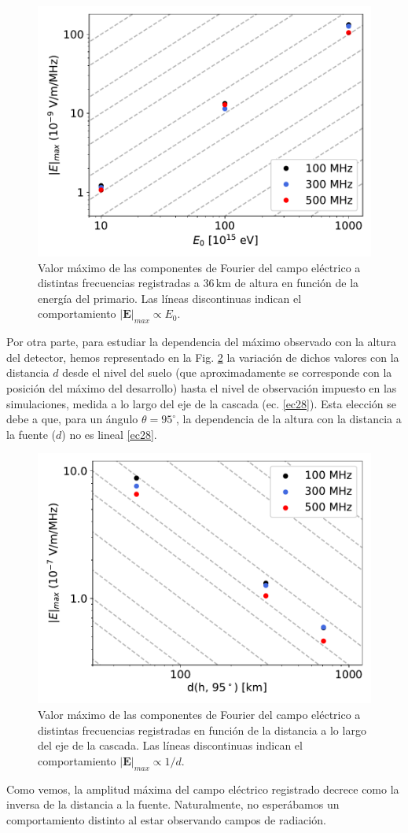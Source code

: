 \documentclass[11 pt, a4paper]{article} %
\numberwithin{equation}{section}
\numberwithin{figure}{section}
\numberwithin{table}{section}
\newcommand{\vect}[1]{\boldsymbol{\mathbf{#1}}}
\begin{document}
\begin{figure}[H]
	\centering
	\includegraphics[width=.5\linewidth]{figures/Radio_UG/85deg_varE_36km_Emax_vs_E}
	\caption{Valor máximo de las componentes de Fourier del campo eléctrico a distintas frecuencias registradas a $36\,\mathrm{km}$ de altura en función de la energía del primario. Las líneas discontinuas indican el comportamiento $\left|\vect{E}\right|_{max}\propto E_0$.}
	\label{EmaxvsE}
\end{figure}
Por otra parte, para estudiar la dependencia del máximo observado con la altura del detector, hemos representado en la Fig. \ref{Emaxvsd} la variación de dichos valores con la distancia $d$  desde el nivel del suelo (que aproximadamente se corresponde con la posición del máximo del desarrollo) hasta el nivel de observación impuesto en las simulaciones, medida a lo largo del eje de la cascada (ec. \ref{ec28}). Esta elección se debe a que, para un ángulo $\theta=95^\circ$, la dependencia de la altura con la distancia a la fuente ($d$) no es lineal \eqref{ec28}.
\begin{figure}[H]
	\centering
	\includegraphics[width=.5\linewidth]{figures/Radio_UG/85deg_1EeV_varh_Emax_vs_d}
	\caption{Valor máximo de las componentes de Fourier del campo eléctrico a distintas frecuencias registradas en función de la distancia a lo largo del eje de la cascada. Las líneas discontinuas indican el comportamiento $\left|\vect{E}\right|_{max}\propto 1/d$.}
	\label{Emaxvsd}
\end{figure}

Como vemos, la amplitud máxima del campo eléctrico registrado decrece como la inversa de la distancia a la fuente. Naturalmente, no esperábamos un comportamiento distinto al estar observando campos de radiación.
\end{document}
